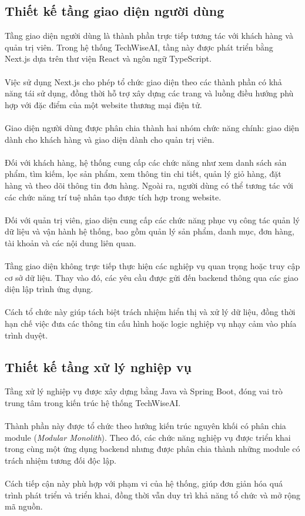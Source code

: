 \documentclass{report}
\begin{document}
\subsection{Thiết kế tầng giao diện người dùng}
Tầng giao diện người dùng là thành phần trực tiếp tương
tác với khách hàng và quản trị viên. Trong hệ thống
TechWiseAI, tầng này được phát triển bằng Next.js dựa
trên thư viện React và ngôn ngữ TypeScript.\\\\
Việc sử dụng Next.js cho phép tổ chức giao diện theo
các thành phần có khả năng tái sử dụng, đồng thời hỗ
trợ xây dựng các trang và luồng điều hướng phù hợp với
đặc điểm của một website thương mại điện tử.\\\\
Giao diện người dùng được phân chia thành hai nhóm
chức năng chính: giao diện dành cho khách hàng và
giao diện dành cho quản trị viên.\\\\
Đối với khách hàng, hệ thống cung cấp các chức năng
như xem danh sách sản phẩm, tìm kiếm, lọc sản phẩm,
xem thông tin chi tiết, quản lý giỏ hàng, đặt hàng
và theo dõi thông tin đơn hàng. Ngoài ra, người dùng
có thể tương tác với các chức năng trí tuệ nhân tạo
được tích hợp trong website.\\\\
Đối với quản trị viên, giao diện cung cấp các chức
năng phục vụ công tác quản lý dữ liệu và vận hành
hệ thống, bao gồm quản lý sản phẩm, danh mục, đơn
hàng, tài khoản và các nội dung liên quan.\\\\
Tầng giao diện không trực tiếp thực hiện các nghiệp
vụ quan trọng hoặc truy cập cơ sở dữ liệu. Thay vào
đó, các yêu cầu được gửi đến backend thông qua các
giao diện lập trình ứng dụng.\\\\
Cách tổ chức này giúp tách biệt trách nhiệm hiển thị
và xử lý dữ liệu, đồng thời hạn chế việc đưa các
thông tin cấu hình hoặc logic nghiệp vụ nhạy cảm
vào phía trình duyệt.

\subsection{Thiết kế tầng xử lý nghiệp vụ}
Tầng xử lý nghiệp vụ được xây dựng bằng Java và
Spring Boot, đóng vai trò trung tâm trong kiến trúc
hệ thống TechWiseAI.\\\\
Thành phần này được tổ chức theo hướng kiến trúc
nguyên khối có phân chia module
(\textit{Modular Monolith}). Theo đó, các chức năng
nghiệp vụ được triển khai trong cùng một ứng dụng
backend nhưng được phân chia thành những module
có trách nhiệm tương đối độc lập.\\\\
Cách tiếp cận này phù hợp với phạm vi của hệ thống,
giúp đơn giản hóa quá trình phát triển và triển khai,
đồng thời vẫn duy trì khả năng tổ chức và mở rộng
mã nguồn.
\end{document}
